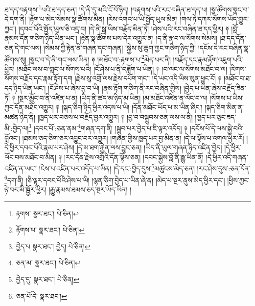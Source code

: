 ཐ་དད་བརྟགས་\footnote{རྟགས་  སྣར་ཐང་།  པེ་ཅིན། }པའི་ཐ་དད་ཅན། །དེ་ནི་དུ་མའི་ངོ་བོ་ཉིད། །བརྟགས་པའི་རང་བཞིན་ཐ་དད་པ། །སྣ་ཚོགས་སྣང་བ་དེ་དག་ནི། །རྟོག་པ་མེད་སེམས་སྣ་ཚོགས་མིན། །རེས་འགའ་པ་ཡི་སྤྱོད་ཡུལ་མིན། །གལ་ཏེ་དཀར་སོགས་ཡོད་གྱུར་ཀྱང་། །དབང་པོའི་སྤྱོད་ཡུལ་ཅི་འདྲ་བ། །དེ་ནི་སྒྲ་ཡིས་བརྗོད་མིན་ཏེ། །ཤེས་པའི་རང་བཞིན་ཐ་དད་ཕྱིར། ༈ །བློ་རྣམས་དོན་གཅིག་ཉིད་ཡིན་ཡང་། །རྟེན་སྣ་ཚོགས་པས་དེར་འགྱུར་ན། །ད་ནི་རྣ་བ་ལ་སོགས་སེམས། །ཐ་དད་དོན་ཅན་དེ་གང་ལས། །སེམས་ཀྱི་རྟེན་ནི་གཞན་དང་གཞན། །སྐྱེས་སུ་ཆུག་ཀྱང་གཅིག་ཉིད་ཀྱི། །དངོས་དེ་རང་བཞིན་སྣ་ཚོགས་སུ། །སྣང་བ་དེ་ནི་གང་ལས་ཡིན། ༈ །མཐོང་བ་:རྟགས་པ་\footnote{རྟོགས་པ་  སྣར་ཐང་།  པེ་ཅིན། }མེད་པར་ནི། །བརྗོད་དང་རྣམ་རྟོག་འཇུག་པའི་ཕྱིར། །མཐོང་ལས་བ་གླང་ལ་སོགས་པའི། །ངོ་ཤེས་པ་ནི་བཟློག་པ་ཡིན། ༈ །བ་ལང་ལ་སོགས་མཐོང་བ་ལ། །རིགས་སོགས་བརྗོད་དང་རྣམ་རྟོག་དག །རྗེས་སུ་འགྲོ་ལས་རྗེས་དཔོག་གང་། །དེ་ཡང་འདི་ཡིས་སུན་ཕྱུང་ངོ། ༈ །མཐོང་བ་ཐ་དད་ཉིད་ཡིན་ཡང་། །ངོ་ཤེས་པ་ཞེས་བྱ་བ་ཡི། །རྣམ་རྟོག་གཅིག་ནི་རང་བཞིན་གྱིས། །བྱེད་པ་ཡིན་ཞེས་བརྗོད་ཟིན་ཏོ། ༈ །སྔར་མྱོང་བ་ནི་འཛིན་པ་ན། །ཡིད་ནི་ཚད་མ་ཉིད་མ་ཡིན། །མ་མཐོང་འཛིན་ན་ལོང་བ་ལ། །སོགས་པ་ཡིས་ཀྱང་དོན་མཐོང་འགྱུར། ༈ །སྐད་ཅིག་ཉིད་ཕྱིར་འདས་པ་ཡི། །དོན་མཐོང་ཡོད་པ་མ་ཡིན་ཞིང་། །སྐད་ཅིག་མིན་ན་མཚན་ཉིད་ནི། །ཁྱད་པར་བཅས་པ་བརྗོད་བྱར་འགྱུར། ༈ །བྱ་བ་བསྒྲུབས་ཅན་ལས་ལ་ནི། །ཁྱད་པར་ཅུང་ཟད་མི་:བྱེད་ལ།\footnote{བྱེད་པ  སྣར་ཐང་། བྱེད།  པེ་ཅིན། } །དབང་པོ་:ཅན་ནམ་\footnote{ཅན་མ་  སྣར་ཐང་།  པེ་ཅིན། }གཞན་དག་ནི། །སྒྲུབ་པར་བྱེད་པ་ཇི་ལྟར་འདོད། ༈ །དངོས་པོ་དེ་ལས་སྐྱེ་བའི་བློའང་། །ཐམས་ཅད་ཅིག་ཅར་འབྱུང་བར་འགྱུར། །གཞན་གྱིས་ཁྱད་པར་བྱ་མིན་ན། །དེ་ལ་ལྟོས་པ་འགལ་ཕྱིར་རོ། །དེ་ཕྱིར་དབང་པོའི་རྣམ་པར་ཤེས། །དེ་མ་ཐག་རྐྱེན་ལས་བྱུང་ཅན། །ཡིད་ནི་ཡུལ་གཞན་ཉིད་འཛིན་བྱེད། །དེ་ཕྱིར་ལོང་བས་མཐོང་བ་མིན། ༈ །རང་དོན་རྗེས་འགྲོའི་དོན་ལྟོས་ཅན། །དབང་སྐྱེས་བློ་ནི་རྒྱུ་ཡིན་ནོ། །དེ་ཕྱིར་འདི་གཞན་འཛིན་ན་ཡང་། །ངེས་པ་འཛིན་པར་འདོད་པ་ཡིན། །དེ་དང་:བྱེད་དུས་\footnote{བྱེད་དུ་  སྣར་ཐང་།  པེ་ཅིན། }མཚུངས་མེད་ཅན། །རང་ཤེས་དུས་:ཅན་དོན་\footnote{ཅན་པོ་དེ་  སྣར་ཐང་། }དག་ནི། །ཅི་ལྟར་དབང་པོའི་ཤེས་པ་ཡི། །ལྷན་ཅིག་བྱེད་པ་ཡིན་ཞེ་ན། །མེད་པ་སྔར་ནུས་མེད་ཕྱིར་དང་། །ཕྱིས་ཀྱང་ཉེ་བར་མི་སྦྱོར་ཕྱིར། །རྒྱུ་རྣམས་ཐམས་ཅད་སྔར་ཡོད་ཡིན། །
